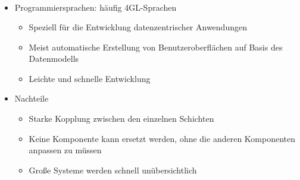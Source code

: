 \begin{frame}[t]
\frametitle{\insertsection}
\framesubtitle{\insertsubsection}		
\onslide
{}\\[4pt]
	\begin{itemize}
		\item Programmiersprachen: häufig 4GL-Sprachen 
		\begin{itemize}
			\item Speziell für die Entwicklung datenzentrischer Anwendungen
			\item Meist automatische Erstellung von Benutzeroberflächen auf Basis des Datenmodells 
		  \item Leichte und schnelle Entwicklung
		\end{itemize}
		\pause
		\item Nachteile
		\begin{itemize}
			\item Starke Kopplung zwischen den einzelnen Schichten 
			\item Keine Komponente kann ersetzt werden, ohne die anderen Komponenten anpassen zu m\"ussen
			\item Große Systeme werden schnell un\"ubersichtlich 
		\end{itemize}
	\end{itemize}
\pause
\abs
{}\\[4pt]
\pause
{}				
\end{frame}

